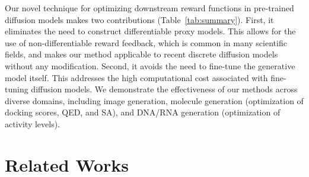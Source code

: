 \begin{table}[!t]
    \centering
        \caption{A comparison of \alg\,to prior approaches. ``Non-differentiable'' refers to the method's ability to operate without requiring differentiable proxy models. ``No Training'' means that no additional training of the diffusion model is required as long as we have access to the reward feedback. We compare to SMC-based methods in . 
        } 
        \vspace{1mm}
    \label{tab:summary}
    \vspace{-6mm}
\end{table}


 Our novel technique for optimizing downstream reward functions in pre-trained diffusion models makes two contributions (Table~\ref{tab:summary}). First, it eliminates the need {to construct differentiable proxy models}. This allows for the use of non-differentiable reward feedback, which is common in many scientific fields, and makes our method applicable to recent discrete diffusion \citep{shi2024simplified,sahoo2024simple} models without any modification. Second, it avoids the need to fine-tune the generative model itself.
 This addresses the high computational cost associated with fine-tuning diffusion models. We demonstrate the effectiveness of our methods across diverse domains, including image generation, molecule generation (optimization of docking scores, QED, and SA), and DNA/RNA generation (optimization of activity levels).

\vspace{-2mm}
\section{Related Works}\label{sec:related_works}
\vspace{-2mm}

